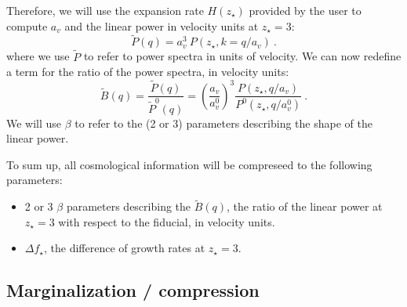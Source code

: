 Therefore, we will use the expansion rate $H(z_\star)$ provided by the user
to compute $a_v$ and the linear power in velocity units at $z_\star=3$:
\begin{equation}
 \tilde P(q) = a_v^3 ~ P(z_\star, k= q / a_v) ~.
\end{equation}
where we use $\tilde P$ to refer to power spectra in units of velocity.
We can now redefine a term for the ratio of the power spectra, in velocity
units:
\begin{equation}
 \tilde B(q) = \frac{\tilde P(q)}{\tilde P^0(q)} 
  = \left(\frac{a_v}{a_v^0}\right)^3 
      \frac{P(z_\star, q / a_v)}{P^0(z_\star, q / a_v^0)} ~.
\end{equation}
We will use $\beta$ to refer to the (2 or 3) parameters describing the shape
of the linear power.

To sum up, all cosmological information will be compreseed to the following
parameters:
\begin{itemize}
 \item 2 or 3 $\beta$ parameters describing the $\tilde B(q)$, the ratio of 
  the linear power at $z_\star=3$ with respect to the fiducial, in velocity
  units.
 \item $\Delta f_\star$, the difference of growth rates at $z_\star=3$.
\end{itemize}



\subsection{Marginalization / compression}


